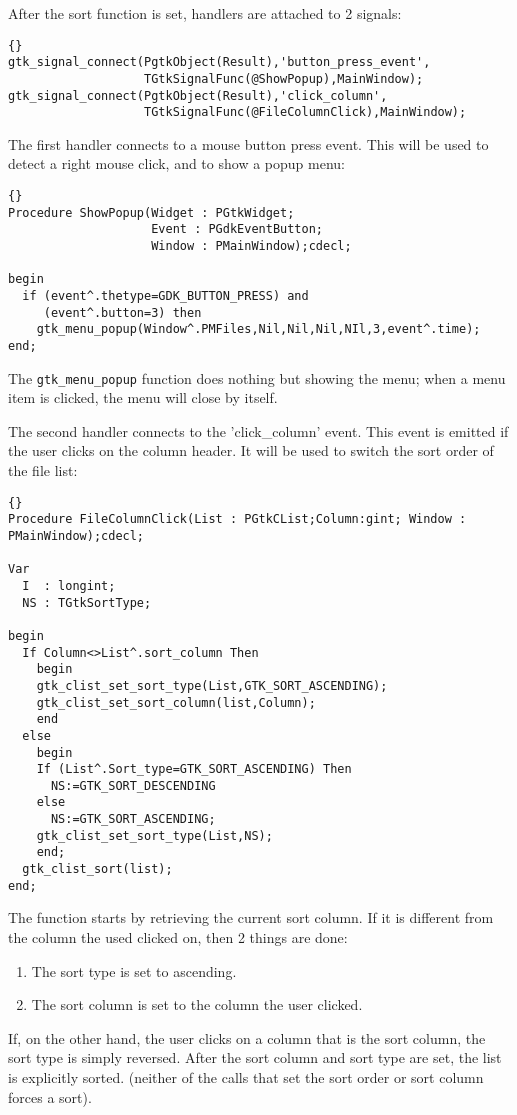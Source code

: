 \documentclass[10pt]{article}
\begin{document}
After the sort function is set, handlers are attached to 2 signals:
\begin{lstlisting}{}
gtk_signal_connect(PgtkObject(Result),'button_press_event',
                   TGtkSignalFunc(@ShowPopup),MainWindow);
gtk_signal_connect(PgtkObject(Result),'click_column',
                   TGtkSignalFunc(@FileColumnClick),MainWindow);
\end{lstlisting}
The first handler connects to a mouse button press event. This will be used
to detect a right mouse click, and to show a popup menu:
\begin{lstlisting}{}
Procedure ShowPopup(Widget : PGtkWidget; 
                    Event : PGdkEventButton; 
                    Window : PMainWindow);cdecl;

begin
  if (event^.thetype=GDK_BUTTON_PRESS) and 
     (event^.button=3) then
    gtk_menu_popup(Window^.PMFiles,Nil,Nil,Nil,NIl,3,event^.time);
end;
\end{lstlisting}
The \lstinline|gtk_menu_popup| function does nothing but showing the menu;
when a menu item is clicked, the menu will close by itself.

The second handler connects to the 'click\_column' event. This event is
emitted if the user clicks on the column header. It will be used to switch
the sort order of the file list:
\begin{lstlisting}{}
Procedure FileColumnClick(List : PGtkCList;Column:gint; Window : PMainWindow);cdecl;

Var 
  I  : longint;
  NS : TGtkSortType;
   
begin
  If Column<>List^.sort_column Then
    begin
    gtk_clist_set_sort_type(List,GTK_SORT_ASCENDING);
    gtk_clist_set_sort_column(list,Column);
    end
  else
    begin
    If (List^.Sort_type=GTK_SORT_ASCENDING) Then 
      NS:=GTK_SORT_DESCENDING
    else
      NS:=GTK_SORT_ASCENDING;
    gtk_clist_set_sort_type(List,NS);
    end;
  gtk_clist_sort(list);
end;
\end{lstlisting}
The function starts by retrieving the current sort column. If it is
different from the column the used clicked on, then 2 things are done:
\begin{enumerate}
\item The sort type is set to ascending.
\item The sort column is set to the column the user clicked.
\end{enumerate}
If, on the other hand, the user clicks on a column that is the sort column, 
the sort type is simply reversed. After the sort column and sort type are 
set, the list is explicitly sorted. (neither of the calls that set the sort 
order or sort column forces a sort).
\end{document}
